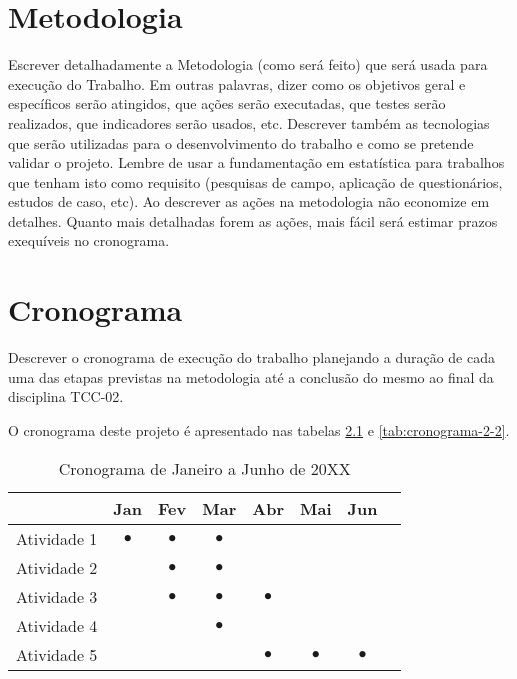 \documentclass[font=plain]{abnt}
\begin{document}
\chapter{Metodologia}
Escrever detalhadamente a Metodologia (como será feito)  que será usada para execução do Trabalho. Em outras palavras, dizer como os objetivos geral e específicos serão atingidos, que ações serão executadas, que testes serão realizados, que indicadores serão usados, etc. Descrever também as tecnologias que serão utilizadas para o desenvolvimento do trabalho e como se pretende validar o projeto. Lembre de usar a fundamentação em estatística para trabalhos que tenham isto como requisito (pesquisas de campo, aplicação de questionários, estudos de caso, etc). Ao descrever as ações na metodologia não economize em detalhes. Quanto mais detalhadas forem as ações, mais fácil será estimar prazos exequíveis no cronograma.


\chapter{Cronograma}

Descrever o cronograma de execução do trabalho planejando a duração de cada uma das etapas previstas na metodologia até a conclusão do mesmo ao final da disciplina TCC-02.

O cronograma deste projeto é apresentado nas tabelas \ref{tab:cronograma-1-2} e \ref{tab:cronograma-2-2}.

\begin{table}[ht]
    \centering
    \begin{tabular}{ p{7.8cm} c c c c c c c }
        \toprule
         & Jan       & Fev       & Mar       & Abr       & Mai       & Jun       & \\
        \midrule
        Atividade 1
         & $\bullet$ & $\bullet$ & $\bullet$ &           &           &           & \\
        \midrule
        Atividade 2
         &           & $\bullet$ & $\bullet$ &           &           &           & \\
        \midrule
        Atividade 3
         &           & $\bullet$ & $\bullet$ & $\bullet$ &           &           & \\
        \midrule
        Atividade 4
         &           &           & $\bullet$ &           &           &           & \\
        \midrule
        Atividade 5
         &           &           &           & $\bullet$ & $\bullet$ & $\bullet$ & \\
        \bottomrule
    \end{tabular}
    \caption{Cronograma de Janeiro a Junho de 20XX}
    \label{tab:cronograma-1-2}
\end{table}
\end{document}
